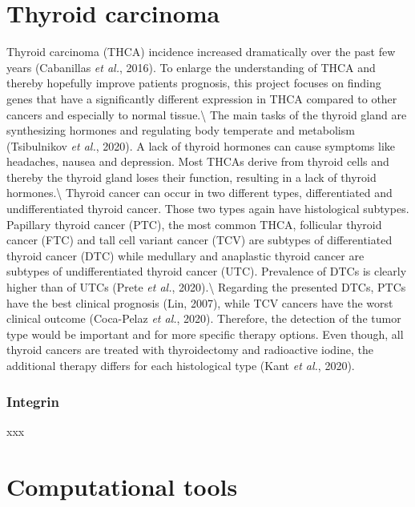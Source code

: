 \documentclass[
  parskip,
  oneside]{scrreprt}
\begin{document}
\hypertarget{thyroid-carcinoma}{%
\section{Thyroid carcinoma}\label{thyroid-carcinoma}}

Thyroid carcinoma (THCA) incidence increased dramatically over the past
few years (Cabanillas \emph{et al.}, 2016). To enlarge the understanding
of THCA and thereby hopefully improve patients prognosis, this project
focuses on finding genes that have a significantly different expression
in THCA compared to other cancers and especially to normal
tissue.\textbackslash{} The main tasks of the thyroid gland are
synthesizing hormones and regulating body temperate and metabolism
(Tsibulnikov \emph{et al.}, 2020). A lack of thyroid hormones can cause
symptoms like headaches, nausea and depression. Most THCAs derive from
thyroid cells and thereby the thyroid gland loses their function,
resulting in a lack of thyroid hormones.\textbackslash{} Thyroid cancer
can occur in two different types, differentiated and undifferentiated
thyroid cancer. Those two types again have histological subtypes.
Papillary thyroid cancer (PTC), the most common THCA, follicular thyroid
cancer (FTC) and tall cell variant cancer (TCV) are subtypes of
differentiated thyroid cancer (DTC) while medullary and anaplastic
thyroid cancer are subtypes of undifferentiated thyroid cancer (UTC).
Prevalence of DTCs is clearly higher than of UTCs (Prete \emph{et al.},
2020).\textbackslash{} Regarding the presented DTCs, PTCs have the best
clinical prognosis (Lin, 2007), while TCV cancers have the worst
clinical outcome (Coca-Pelaz \emph{et al.}, 2020). Therefore, the
detection of the tumor type would be important and for more specific
therapy options. Even though, all thyroid cancers are treated with
thyroidectomy and radioactive iodine, the additional therapy differs for
each histological type (Kant \emph{et al.}, 2020).

\hypertarget{integrin}{%
\subsubsection{Integrin}\label{integrin}}

xxx

\hypertarget{computational-tools}{%
\section{Computational tools}\label{computational-tools}}
\end{document}
